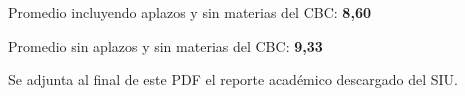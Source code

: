 Promedio incluyendo aplazos y sin materias del CBC: \textbf{8,60}

Promedio sin aplazos y sin materias del CBC: \textbf{9,33}

Se adjunta al final de este PDF el reporte académico descargado del SIU.

